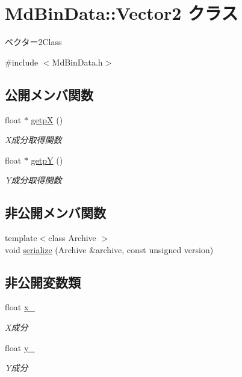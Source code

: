 \hypertarget{class_md_bin_data_1_1_vector2}{}\section{Md\+Bin\+Data\+:\+:Vector2 クラス}
\label{class_md_bin_data_1_1_vector2}


ベクター2\+Class  




{\ttfamily \#include $<$Md\+Bin\+Data.\+h$>$}

\subsection*{公開メンバ関数}
\begin{DoxyCompactItemize}
\item 
float $\ast$ \mbox{\hyperlink{class_md_bin_data_1_1_vector2_a6d45ff9158c5056f0b9555ee4cb68924}{getpX}} ()
\begin{DoxyCompactList}\small\item\em X成分取得関数 \end{DoxyCompactList}\item 
float $\ast$ \mbox{\hyperlink{class_md_bin_data_1_1_vector2_a12d825bc212f5b598d5e9b29860999a1}{getpY}} ()
\begin{DoxyCompactList}\small\item\em Y成分取得関数 \end{DoxyCompactList}\end{DoxyCompactItemize}
\subsection*{非公開メンバ関数}
\begin{DoxyCompactItemize}
\item 
{\footnotesize template$<$class Archive $>$ }\\void \mbox{\hyperlink{class_md_bin_data_1_1_vector2_a12fa2dd687f2d32fb889df7bcc5cf126}{serialize}} (Archive \&archive, const unsigned version)
\end{DoxyCompactItemize}
\subsection*{非公開変数類}
\begin{DoxyCompactItemize}
\item 
float \mbox{\hyperlink{class_md_bin_data_1_1_vector2_a8aee2bb63b9f8322e5e40140aa4a3b81}{x\+\_\+}}
\begin{DoxyCompactList}\small\item\em X成分 \end{DoxyCompactList}\item 
float \mbox{\hyperlink{class_md_bin_data_1_1_vector2_afdd7301e3bb185356463203385c30e1f}{y\+\_\+}}
\begin{DoxyCompactList}\small\item\em Y成分 \end{DoxyCompactList}\end{DoxyCompactItemize}
